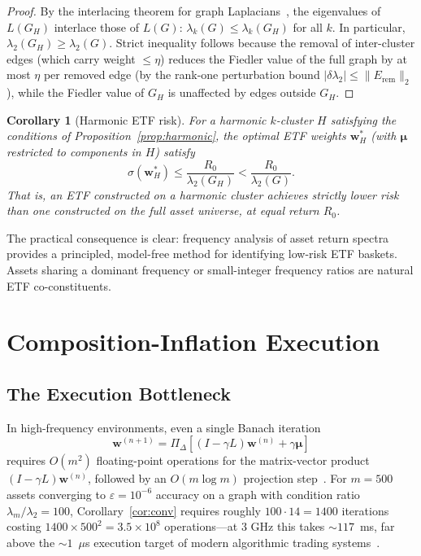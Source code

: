 \documentclass[twocolumn,11pt,a4paper]{article}
\newtheorem{corollary}[theorem]{Corollary}
\theoremstyle{remark}
\newcommand{\bw}{\mathbf{w}}
\newcommand{\bmu}{\bm{\mu}}
\newcommand{\lam}[1]{\lambda_{#1}}
\newcommand{\Proj}{\Pi_\Delta}
\begin{document}
\begin{proof}
By the interlacing theorem for graph Laplacians~\cite{haemers1995},
the eigenvalues of $L(G_H)$ interlace those of $L(G)$:
$\lam{k}(G) \leq \lam{k}(G_H)$ for all $k$.
In particular, $\lam{2}(G_H) \geq \lam{2}(G)$.
Strict inequality follows because the removal of inter-cluster edges
(which carry weight $\leq\eta$) reduces the Fiedler value of the full
graph by at most $\eta$ per removed edge (by the rank-one perturbation bound
$|\delta\lam{2}| \leq \|E_{\text{rem}}\|_2$), while the Fiedler value
of $G_H$ is unaffected by edges outside $G_H$.
\end{proof}

\begin{corollary}[Harmonic ETF risk]
\label{cor:etfrisk}
For a harmonic $k$-cluster $H$ satisfying the conditions of Proposition~\ref{prop:harmonic},
the optimal ETF weights $\bw^*_H$ (with $\bmu$ restricted to components in $H$) satisfy
\begin{equation}
  \sigma(\bw^*_H) \leq \frac{R_0}{\lam{2}(G_H)} < \frac{R_0}{\lam{2}(G)}.
\end{equation}
That is, an ETF constructed on a harmonic cluster achieves strictly lower risk
than one constructed on the full asset universe, at equal return $R_0$.
\end{corollary}

The practical consequence is clear: frequency analysis of asset return spectra
provides a principled, model-free method for identifying low-risk ETF baskets.
Assets sharing a dominant frequency or small-integer frequency ratios are
natural ETF co-constituents.


\section{Composition-Inflation Execution}
\label{sec:exec}

\subsection{The Execution Bottleneck}

In high-frequency environments, even a single Banach iteration
\begin{equation}
  \bw^{(n+1)} = \Proj[(I-\gamma L)\bw^{(n)} + \gamma\bmu]
\end{equation}
requires $O(m^2)$ floating-point operations for the matrix-vector product $(I-\gamma L)\bw^{(n)}$,
followed by an $O(m\log m)$ projection step~\cite{duchi2008}.
For $m=500$ assets converging to $\varepsilon=10^{-6}$ accuracy on a graph with
condition ratio $\lam{m}/\lam{2} = 100$, Corollary~\ref{cor:conv} requires roughly
$100\cdot 14 = 1400$ iterations costing $1400\times 500^2 = 3.5\times 10^8$
operations---at 3 GHz this takes $\sim 117$~ms, far above the $\sim 1$~$\mu$s
execution target of modern algorithmic trading systems~\cite{aldridge2013}.
\end{document}
